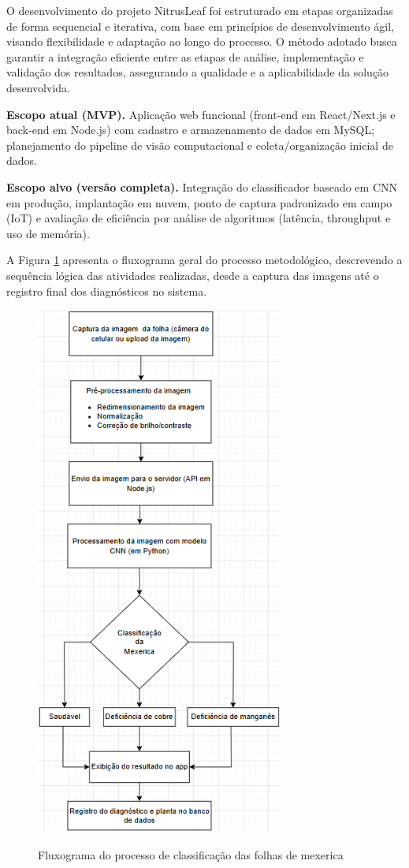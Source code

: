 O desenvolvimento do projeto NitrusLeaf foi estruturado em etapas organizadas de forma sequencial e iterativa, com base em princípios de desenvolvimento ágil, visando flexibilidade e adaptação ao longo do processo. O método adotado busca garantir a integração eficiente entre as etapas de análise, implementação e validação dos resultados, assegurando a qualidade e a aplicabilidade da solução desenvolvida.

\medskip
\noindent\textbf{Escopo atual (MVP).} Aplicação web funcional (front-end em React/Next.js e back-end em Node.js) com cadastro e armazenamento de dados em MySQL; planejamento do pipeline de visão computacional e coleta/organização inicial de dados.

\medskip
\noindent\textbf{Escopo alvo (versão completa).} Integração do classificador baseado em CNN em produção, implantação em nuvem, ponto de captura padronizado em campo (IoT) e avaliação de eficiência por análise de algoritmos (latência, throughput e uso de memória).
\medskip

A Figura \ref{fig:fluxograma} apresenta o fluxograma geral do processo metodológico, descrevendo a sequência lógica das atividades realizadas, desde a captura das imagens até o registro final dos diagnósticos no sistema.

\begin{figure}[H]
    \centering
    \caption{Fluxograma do processo de classificação das folhas de mexerica}
    \includegraphics[width=0.6\linewidth]{Illustrations/fluxograma.png}
    \label{fig:fluxograma}
\end{figure}

